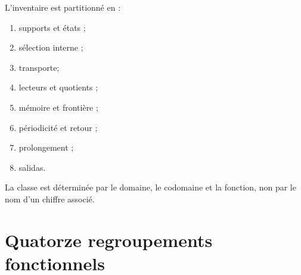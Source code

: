L’inventaire est partitionné en :
\begin{enumerate}
 \item[\textbf{C1.}] supports et états ;
 \item[\textbf{C2.}] sélection interne ;
 \item[\textbf{C3.}] transporte;
 \item[\textbf{C4.}] lecteurs et quotients ;
 \item[\textbf{C5.}] mémoire et frontière ;
 \item[\textbf{C6.}] périodicité et retour ;
 \item[\textbf{C7.}] prolongement ;
 \item[\textbf{C8.}] salidas.
\end{enumerate}
La classe est déterminée par le domaine, le codomaine et la fonction, non par le nom
d’un chiffre associé.

\section{Quatorze regroupements fonctionnels}

